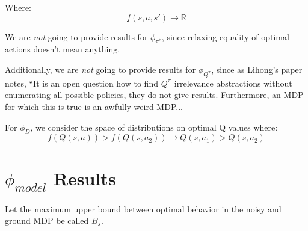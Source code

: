 \documentclass[11pt]{amsart}
\begin{document}
Where:
\begin{equation}
f(s,a,s') \rightarrow \mathbb{R}
\end{equation}


 We are {\it not} going to provide results for $\phi_{\pi^*}$, since relaxing equality of optimal actions doesn't mean anything.

 Additionally, we are {\it not} going to provide results for $\phi_{Q^\pi}$, since as Lihong's paper notes, ``It is an open question how to find $Q^\pi$ irrelevance abstractions without enumerating all possible policies, they do not give results. Furthermore, an MDP for which this is true is an awfully weird MDP...

 For $\phi_D$, we consider the space of distributions on optimal Q values where:
\begin{equation}
f(Q(s,a)) > f(Q(s,a_2)) \rightarrow Q(s,a_1) > Q(s,a_2)
\end{equation}

\newpage
\section{$\phi_{model}$ Results}

Let the maximum upper bound between optimal behavior in the noisy and ground MDP be called $B_s$.
\end{document}
